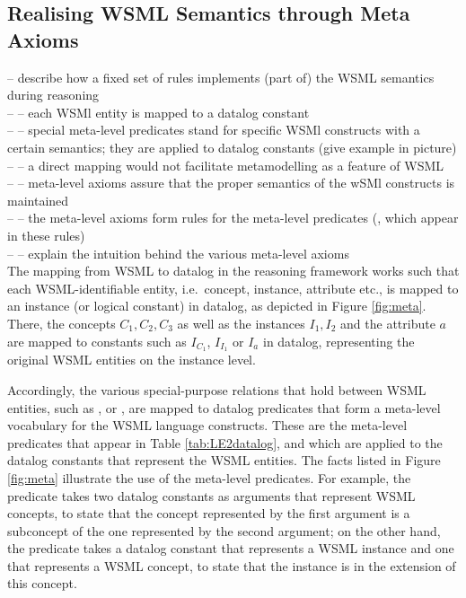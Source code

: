 \subsection{Realising WSML Semantics through Meta Axioms}
-- describe how a fixed set of rules implements (part of) the WSML semantics during reasoning \\
-- -- each WSMl entity is mapped to a datalog constant \\
-- -- special meta-level predicates stand for specific WSMl constructs with a certain semantics; they are applied to datalog constants (give example in picture) \\
-- -- a direct mapping would not facilitate metamodelling as a feature of WSML \\
-- -- meta-level axioms assure that the proper semantics of the wSMl constructs is maintained \\
-- -- the meta-level axioms form rules for the meta-level predicates (, which appear in these rules) \\
-- -- explain the intuition behind the various meta-level axioms \\

The mapping from WSML to datalog in the reasoning framework works
such that each WSML-identifiable entity, i.e.\ concept, instance,
attribute etc., is mapped to an instance (or logical constant) in
datalog, as depicted in Figure \ref{fig:meta}. There, the concepts
$C_1, C_2, C_3$ as well as the instances $I_1, I_2$ and the
attribute $a$ are mapped to constants such as $I_{C_1}$, $I_{I_1}$
or $I_a$ in datalog, representing the original WSML entities on
the instance level.

Accordingly, the various special-purpose relations that hold
between WSML entities, such as ,
 or , are mapped to datalog
predicates that form a meta-level vocabulary for the WSML language
constructs. These are the meta-level predicates that appear in
Table \ref{tab:LE2datalog}, and which are applied to the datalog
constants that represent the WSML entities. The facts listed in
Figure \ref{fig:meta} illustrate the use of the meta-level
predicates. For example, the predicate \psco takes two datalog
constants as arguments that represent WSML concepts, to state that
the concept represented by the first argument is a subconcept of
the one represented by the second argument; on the other hand, the
predicate \pmo takes a datalog constant that represents a WSML
instance and one that represents a WSML concept, to state that the
instance is in the extension of this concept.

